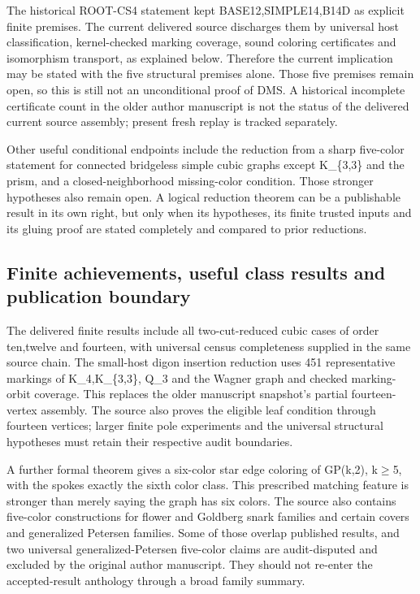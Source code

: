 \documentclass[11pt,a4paper]{article}
\begin{document}
The historical ROOT-CS4 statement kept BASE12,SIMPLE14,B14D as explicit finite premises. The current delivered source discharges them by universal host classification, kernel-checked marking coverage, sound coloring certificates and isomorphism transport, as explained below. Therefore the current implication may be stated with the five structural premises alone. Those five premises remain open, so this is still not an unconditional proof of DMS. A historical incomplete certificate count in the older author manuscript is not the status of the delivered current source assembly; present fresh replay is tracked separately.

Other useful conditional endpoints include the reduction from a sharp five-color statement for connected bridgeless simple cubic graphs except K\_\{3,3\} and the prism, and a closed-neighborhood missing-color condition. Those stronger hypotheses also remain open. A logical reduction theorem can be a publishable result in its own right, but only when its hypotheses, its finite trusted inputs and its gluing proof are stated completely and compared to prior reductions.

\subsection{Finite achievements, useful class results and publication boundary}
The delivered finite results include all two-cut-reduced cubic cases of order ten,twelve and fourteen, with universal census completeness supplied in the same source chain. The small-host digon insertion reduction uses 451 representative markings of K\_4,K\_\{3,3\}, Q\_3 and the Wagner graph and checked marking-orbit coverage. This replaces the older manuscript snapshot's partial fourteen-vertex assembly. The source also proves the eligible leaf condition through fourteen vertices; larger finite pole experiments and the universal structural hypotheses must retain their respective audit boundaries.

A further formal theorem gives a six-color star edge coloring of GP(k,2), k\ensuremath{\geq}5, with the spokes exactly the sixth color class. This prescribed matching feature is stronger than merely saying the graph has six colors. The source also contains five-color constructions for flower and Goldberg snark families and certain covers and generalized Petersen families. Some of those overlap published results, and two universal generalized-Petersen five-color claims are audit-disputed and excluded by the original author manuscript. They should not re-enter the accepted-result anthology through a broad family summary.
\end{document}
